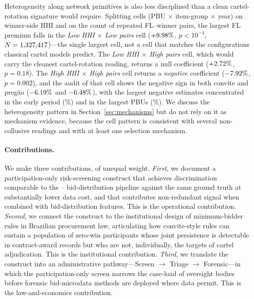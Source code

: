 Heterogeneity along network primitives is also less
disciplined than a clean cartel-rotation signature would
require. Splitting cells (PBU $\times$ item-group $\times$ year)
on winner-side HHI and on the count of repeated FL--winner
pairs, the largest FL premium falls in the
\emph{Low HHI $\times$ Low pairs} cell ($+9.98\%$, $p < 10^{-4}$,
$N = 1{,}327{,}417$)---the single largest cell, not a cell that
matches the configurations classical cartel models
\citep{harrington2008detecting} predict. The \emph{Low HHI $\times$ High pairs} cell, which
would carry the cleanest cartel-rotation reading, returns a
null coefficient ($+2.72\%$, $p = 0.18$). The
\emph{High HHI $\times$ High pairs} cell returns a
\emph{negative} coefficient ($-7.92\%$, $p = 0.002$), and
the audit of that cell shows the negative sign in both convite
and pregão ($-6.19\%$ and $-6.48\%$),
with the largest negative estimates concentrated in the early
period (\valNegCellEarlyCoef\%) and in the largest PBUs
(\valNegCellPBUQFourCoef\%). We discuss the heterogeneity pattern in
Section~\ref{sec:mechanisms} but do not rely on it as
mechanism evidence, because the cell pattern is consistent
with several non-collusive readings and with at least one
selection mechanism.

\paragraph{Contributions.} We make three contributions, of
unequal weight. \emph{First}, we document a participation-only
risk-screening construct that achieves discrimination
comparable to the
\citeauthor{imhof2019detecting}--\citeauthor{huber2019machine}
bid-distribution pipeline against the same ground truth at
substantially lower data cost, and that contributes
non-redundant signal when combined with bid-distribution
features. This is the operational contribution. \emph{Second},
we connect the construct to the institutional design of
minimum-bidder rules in Brazilian procurement law, articulating
how convite-style rules can sustain a population of zero-win
participants whose joint persistence is detectable in
contract-award records but who are not, individually, the
targets of cartel adjudication. This is the institutional
contribution. \emph{Third}, we translate the construct into an
administrative pathway---Screen $\to$ Triage $\to$ Forensic---in
which the participation-only screen narrows the case-load of
oversight bodies before forensic bid-microdata methods are
deployed where data permit. This is the law-and-economics
contribution.

